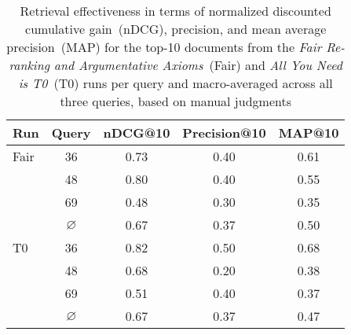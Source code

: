 \begin{table}
    \centering
    \caption{Retrieval effectiveness in terms of normalized discounted cumulative gain~(nDCG), precision, and mean average precision~(MAP) for the top-10 documents from the \emph{Fair Re-ranking and Argumentative Axioms}~(Fair) and \emph{All You Need is T0}~(T0) runs per query and macro-averaged across all three queries, based on manual judgments
    }
    \label{table-effectiveness}
    \begin{tabular}{lcccc}
        \toprule
        \textbf{Run} & \textbf{Query} & \textbf{nDCG@10} & \textbf{Precision@10} & \textbf{MAP@10} \\
        \midrule
        Fair       & 36 & 0.73 & 0.40 & 0.61 \\
                   & 48 & 0.80 & 0.40 & 0.55 \\
                   & 69 & 0.48 & 0.30 & 0.35 \\
        & $\varnothing$ & 0.67 & 0.37 & 0.50 \\
        \midrule
        T0         & 36 & 0.82 & 0.50 & 0.68 \\
                   & 48 & 0.68 & 0.20 & 0.38 \\
                   & 69 & 0.51 & 0.40 & 0.37 \\
        & $\varnothing$ & 0.67 & 0.37 & 0.47 \\
        \bottomrule
    \end{tabular}
\end{table}